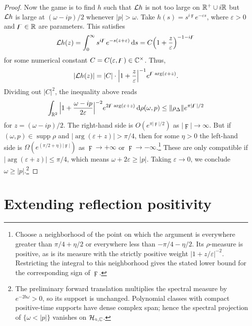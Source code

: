 \begin{proof}
    Now the game is to find $h$ such that $\mathcal{L} h$ is not too large on
    $\mathbb{R}^+\cup i\mathbb{R}$ but $\mathcal{L} h$ is large at $(\omega-ip)/2$
    whenever $|p|>\omega$. Take $h(s)=s^{i\digamma}e^{-\varepsilon s}$,
    where $\varepsilon>0$ and $\digamma\in\mathbb{R}$ are parameters. This satisfies
    \begin{equation}
        \mathcal{L} h(z)=\int_0^\infty s^{i\digamma}e^{-s(z+\varepsilon)}\,\mathrm{d} s
        =C\Big(1+\frac z\varepsilon\Big)^{-1-i\digamma}
    \end{equation}
    for some numerical constant $C=C(\varepsilon,\digamma)\in\mathbb{C}^\times$.
    Thus,
    \begin{equation}
        |\mathcal{L} h(z)|=|C|\cdot\Big|1+\frac z\varepsilon\Big|^{-1}
        e^{\digamma\operatorname{arg}(\varepsilon+z)}.
    \end{equation}
    Dividing out $|C|^2$, the inequality above reads
    \begin{equation}
        \int_{\mathbb{R}^2}\Big|1+\frac{\omega-ip}{2\varepsilon}\Big|^{-2}
        e^{2\digamma\operatorname{arg}(\varepsilon+z)}\,\mathrm{d}\rho(\omega,p)
        \leq\lVert\rho_\Delta\rVert e^{\pi|\digamma|/2}
    \end{equation}
    for $z=(\omega-ip)/2$. The right-hand side is
    $O(e^{\pi|\digamma|/2})$ as $|\digamma|\to\infty$.
    But if $(\omega,p)\in\operatorname{supp}\rho$ and
    $|\operatorname{arg}(\varepsilon+z)|>\pi/4$, then for some $\eta>0$
    the left-hand side is $\Omega(e^{(\pi/2+\eta)|\digamma|})$
    as $\digamma\to+\infty$ or $\digamma\to-\infty$.\footnote{Choose a
    neighborhood of the point on which the argument is everywhere
    greater than $\pi/4+\eta/2$ or everywhere less than
    $-\pi/4-\eta/2$. Its $\rho$-measure is positive, as is its measure
    with the strictly positive weight $|1+z/\varepsilon|^{-2}$.
    Restricting the integral to this neighborhood gives the stated
    lower bound for the corresponding sign of $\digamma$.}
    These are only compatible if $|\operatorname{arg}(\varepsilon+z)|\leq\pi/4$,
    which means $\omega+2\varepsilon\geq|p|$.
    Taking $\varepsilon\to0$, we conclude $\omega\geq|p|$.\footnote{The
    preliminary forward translation multiplies the spectral measure by
    $e^{-2b\omega}>0$, so its support is unchanged. Polynomial classes
    with compact positive-time supports have dense complex span; hence
    the spectral projection of $\{\omega<|p|\}$ vanishes on
    $\mathcal{H}_{\circ,\mathbb{C}}$.}
\end{proof}


\section{Extending reflection positivity}\label{sec:extend-RP}
\enlargethispage{2pt}


